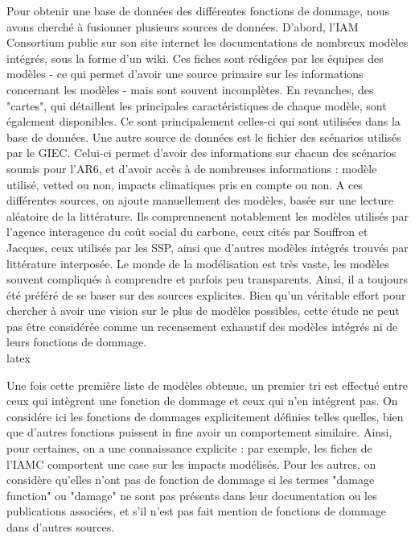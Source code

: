 \begin{methodbox}
Pour obtenir une base de données des différentes fonctions de dommage, nous avons cherché à fusionner plusieurs sources de données. D'abord, l'IAM Consortium publie sur son site internet les documentations de nombreux modèles intégrés, sous la forme d'un wiki. Ces fiches sont rédigées par les équipes des modèles - ce qui permet d'avoir une source primaire sur les informations concernant les modèles - mais sont souvent incomplètes. En revanches, des "cartes", qui détaillent les principales caractéristiques de chaque modèle, sont également disponibles. Ce sont principalement celles-ci qui sont utilisées dans la base de données. Une autre source de données est le fichier des scénarios utilisés par le GIEC. Celui-ci permet d'avoir des informations sur chacun des scénarios soumis pour l'AR6, et d'avoir accès à de nombreuses informations : modèle utilisé, vetted ou non, impacts climatiques pris en compte ou non. A ces différentes sources, on ajoute manuellement des modèles, basée sur une lecture aléatoire de la littérature. Ils comprennenent notablement les modèles utilisés par l'agence interagence du coût social du carbone, ceux cités par Souffron et Jacques, ceux utilisés par les SSP, ainsi que d'autres modèles intégrés trouvés par littérature interposée. 
Le monde de la modélisation est très vaste, les modèles souvent compliqués à comprendre et parfois peu transparents. Ainsi, il a toujours été préféré de se baser sur des sources explicites. Bien qu'un véritable effort pour chercher à avoir une vision sur le plus de modèles possibles, cette étude ne peut pas être considérée comme un recensement exhaustif des modèles intégrés ni de leurs fonctions de dommage. \\ \gls{latex}

Une fois cette première liste de modèles obtenue, un premier tri est effectué entre ceux qui intègrent une fonction de dommage et ceux qui n'en intégrent pas. On considére ici les fonctions de dommages explicitement définies telles quelles, bien que d'autres fonctions puissent in fine avoir un comportement similaire. Ainsi, pour certaines, on a une connaissance explicite : par exemple, les fiches de l'IAMC comportent une case sur les impacts modélisés. Pour les autres, on considère qu'elles n'ont pas de fonction de dommage si les termes "damage function" ou "damage" ne sont pas présents dans leur documentation ou les publications associées, et s'il n'est pas fait mention de fonctions de dommage dans d'autres sources. \\


\end{methodbox}
